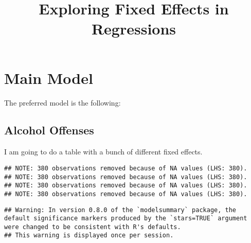 \documentclass[
]{article}
\title{Exploring Fixed Effects in Regressions}
\author{}
\date{\vspace{-2.5em}}
\begin{document}
\maketitle

\hypertarget{main-model}{%
\section{Main Model}\label{main-model}}

The preferred model is the following:

\hypertarget{alcohol-offenses}{%
\subsection{Alcohol Offenses}\label{alcohol-offenses}}

I am going to do a table with a bunch of different fixed effects.

\begin{verbatim}
## NOTE: 380 observations removed because of NA values (LHS: 380).
## NOTE: 380 observations removed because of NA values (LHS: 380).
## NOTE: 380 observations removed because of NA values (LHS: 380).
## NOTE: 380 observations removed because of NA values (LHS: 380).
\end{verbatim}

\begin{verbatim}
## Warning: In version 0.8.0 of the `modelsummary` package, the default significance markers produced by the `stars=TRUE` argument were changed to be consistent with R's defaults.
## This warning is displayed once per session.
\end{verbatim}
\end{document}
